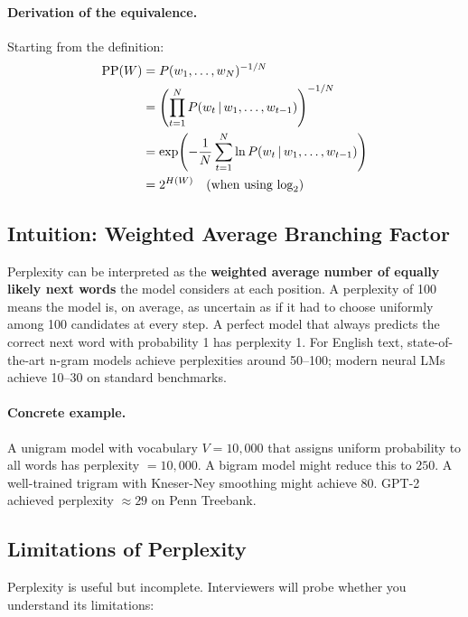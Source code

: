 \paragraph{Derivation of the equivalence.}
Starting from the definition:
\begin{align*}
\text{PP}(W) &= P(w_1, \ldots, w_N)^{-1/N} \\
&= \left(\prod_{t=1}^{N} P(w_t \,|\, w_1, \ldots, w_{t-1})\right)^{-1/N} \\
&= \exp\!\left(-\frac{1}{N}\sum_{t=1}^{N} \ln P(w_t \,|\, w_1, \ldots, w_{t-1})\right) \\
&= 2^{H(W)} \quad\text{(when using $\log_2$)}
\end{align*}

\subsection{Intuition: Weighted Average Branching Factor}

\begin{keyinsight}
Perplexity can be interpreted as the \textbf{weighted average number of
equally likely next words} the model considers at each position.  A perplexity
of 100 means the model is, on average, as uncertain as if it had to choose
uniformly among 100 candidates at every step.  A perfect model that always
predicts the correct next word with probability 1 has perplexity 1.  For
English text, state-of-the-art n-gram models achieve perplexities around
50--100; modern neural LMs achieve 10--30 on standard benchmarks.
\end{keyinsight}

\paragraph{Concrete example.}
A unigram model with vocabulary $V = 10{,}000$ that assigns uniform
probability to all words has perplexity $= 10{,}000$.  A bigram model might
reduce this to $250$.  A well-trained trigram with Kneser-Ney smoothing might
achieve $80$.  GPT-2 achieved perplexity $\approx 29$ on Penn Treebank.

\subsection{Limitations of Perplexity}

Perplexity is useful but incomplete.  Interviewers will probe whether you
understand its limitations:

